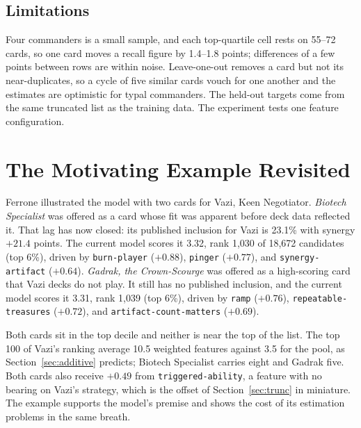 \documentclass[11pt]{article}
\theoremstyle{remark}
\newcommand{\otag}[1]{\texttt{#1}}
\begin{document}
\subsection{Limitations}
\noindent Four commanders is a small sample, and each top-quartile cell rests on
55--72 cards, so one card moves a recall figure by 1.4--1.8 points; differences
of a few points between rows are within noise. Leave-one-out removes a card but not
its near-duplicates, so a cycle of five similar cards vouch for one another and
the estimates are optimistic for typal commanders. The held-out targets come from
the same truncated list as the training data. The experiment tests one feature
configuration.

\section{The Motivating Example Revisited}
\noindent Ferrone illustrated the model with two cards for Vazi, Keen Negotiator.
\emph{Biotech Specialist} was offered as a card whose fit was apparent before
deck data reflected it. That lag has now closed: its published inclusion for Vazi
is 23.1\% with synergy $+21.4$ points. The current model scores it 3.32, rank
1{,}030 of 18{,}672 candidates (top 6\%), driven by \otag{burn-player}
($+0.88$), \otag{pinger} ($+0.77$), and \otag{synergy-artifact} ($+0.64$).
\emph{Gadrak, the Crown-Scourge} was offered as a high-scoring card that Vazi
decks do not play. It still has no published inclusion, and the current model
scores it 3.31, rank 1{,}039 (top 6\%), driven by \otag{ramp} ($+0.76$),
\otag{repeatable-treasures} ($+0.72$), and \otag{artifact-count-matters}
($+0.69$).

Both cards sit in the top decile and neither is near the top of the list. The
top 100 of Vazi's ranking average 10.5 weighted features against 3.5 for the pool,
as Section~\ref{sec:additive} predicts; Biotech Specialist carries eight and
Gadrak five. Both cards also receive $+0.49$ from
\otag{triggered-ability}, a feature with no bearing on Vazi's strategy, which is
the offset of Section~\ref{sec:trunc} in miniature. The example supports the
model's premise and shows the cost of its estimation problems in the same
breath.
\end{document}
